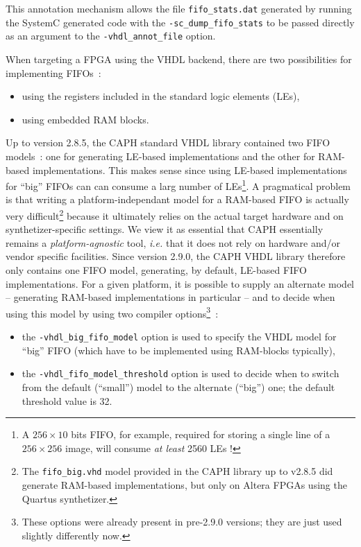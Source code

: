 This annotation mechanism allows the file \verb|fifo_stats.dat| generated by running the SystemC generated code with the
\verb|-sc_dump_fifo_stats| to be passed directly as an argument to the \verb|-vhdl_annot_file|
option. 

\medskip
When targeting a FPGA using the VHDL backend, there are two possibilities for implementing FIFOs~:
\begin{itemize}
\item using the registers included in the standard logic elements (LEs),
\item using embedded RAM blocks.
\end{itemize}
Up to version 2.8.5, the CAPH standard VHDL library contained two FIFO models~: one for generating
LE-based implementations and the other for RAM-based implementations.  This makes sense since using
LE-based implementations for ``big'' FIFOs can can consume a larg number of LEs\footnote{A
  $256 \times 10$ bits FIFO, for example, required for storing a single line of a $256 \times 256$
  image, will consume \emph{at least} 2560 LEs !}.  A pragmatical problem is that writing a
platform-independant model for a RAM-based FIFO is actually very difficult\footnote{The
  \texttt{fifo\_big.vhd} model provided in the CAPH library up to v2.8.5 did generate RAM-based
  implementations, but only on Altera FPGAs using the Quartus synthetizer.} because it ultimately
relies on the actual target hardware and on synthetizer-specific settings.  We view it as essential
that CAPH essentially remains a \emph{platform-agnostic} tool, \emph{i.e.} that it does not rely on
hardware and/or vendor specific facilities. Since version 2.9.0, the CAPH VHDL library therefore
only contains one FIFO model, generating, by default, LE-based FIFO implementations. For a given
platform, it is possible to supply an alternate model -- generating RAM-based implementations in
particular -- and to decide when using this model by using two compiler options\footnote{These options were
  already present in pre-2.9.0 versions; they are just used slightly differently now.}~:
\begin{itemize}
\item the \verb|-vhdl_big_fifo_model| option is used to specify the VHDL model for ``big'' FIFO
  (which have to be implemented using RAM-blocks typically),
\item the \verb|-vhdl_fifo_model_threshold| option is used to decide when to switch from the default
  (``small'') model to the alternate (``big'') one; the default threshold value is 32. 
\end{itemize}
